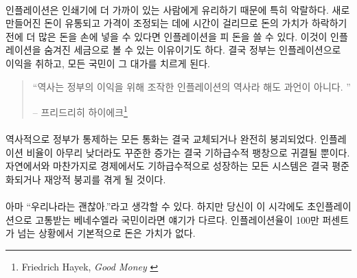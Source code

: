 \paragraph{}
인플레이션은 인쇄기에 더 가까이 있는 사람에게 유리하기 때문에 특히 악랄하다. 
새로 만들어진 돈이 유통되고 가격이 조정되는 데에 시간이 걸리므로 
돈의 가치가 하락하기 전에 더 많은 돈을 손에 넣을 수 있다면 인플레이션을 피 돈을 쓸 수 있다. 
이것이 인플레이션을 숨겨진 세금으로 볼 수 있는 이유이기도 하다.
결국 정부는 인플레이션으로 이익을 취하고, 모든 국민이 그 대가를 치르게 된다.

\begin{quotation}\begin{samepage}
		\enquote{역사는 정부의 이익을 위해 조작한 인플레이션의 역사라 해도 과언이 아니다. }
		\begin{flushright} -- 프리드리히 하이에크\footnote{Friedrich Hayek, \textit{Good Money} \cite{hayek-good-money}}
\end{flushright}\end{samepage}\end{quotation}

\paragraph{}
역사적으로 정부가 통제하는 모든 통화는 결국 교체되거나 완전히 붕괴되었다. 
인플레이션 비율이 아무리 낮더라도 꾸준한 증가는 결국 기하급수적 팽창으로 귀결될 뿐이다. 
자연에서와 마찬가지로 경제에서도 기하급수적으로 성장하는 
모든 시스템은 결국 평준화되거나 재앙적 붕괴를 겪게 될 것이다.

\paragraph{}
아마 \enquote{우리나라는 괜찮아.}라고 생각할 수 있다.
하지만 당신이 이 시각에도 초인플레이션으로 고통받는 베네수엘라 국민이라면 얘기가 다르다.  
인플레이션율이 100만 퍼센트가 넘는 상황에서 기본적으로 돈은 가치가 없다.\cite{wiki:venezuela}

